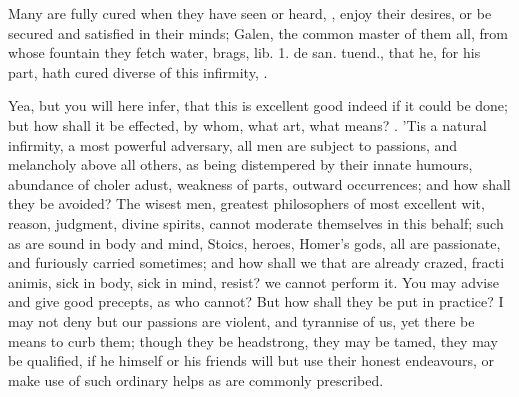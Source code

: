 {Many are fully cured when they have seen or heard, \etc{}, enjoy their
desires, or be secured and satisfied in their minds; Galen, the common
master of them all, from whose fountain they fetch water, brags, lib.
1. de san. tuend., that he, for his part, hath cured diverse of this
infirmity, .

Yea, but you will here infer, that this is excellent good indeed if it
could be done; but how shall it be effected, by whom, what art, what
means? . 'Tis a natural infirmity, a most
powerful adversary, all men are subject to passions, and melancholy
above all others, as being distempered by their innate humours,
abundance of choler adust, weakness of parts, outward occurrences; and
how shall they be avoided? The wisest men, greatest philosophers of
most excellent wit, reason, judgment, divine spirits, cannot moderate
themselves in this behalf; such as are sound in body and mind, Stoics,
heroes, Homer's gods, all are passionate, and furiously carried
sometimes; and how shall we that are already crazed, fracti animis,
sick in body, sick in mind, resist? we cannot perform it. You may
advise and give good precepts, as who cannot? But how shall they be put
in practice? I may not deny but our passions are violent, and tyrannise
of us, yet there be means to curb them; though they be headstrong, they
may be tamed, they may be qualified, if he himself or his friends will
but use their honest endeavours, or make use of such ordinary helps as
are commonly prescribed.

}
